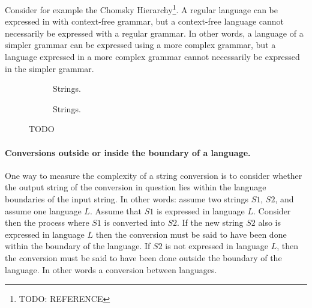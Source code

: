 \documentclass{scrreprt}
\begin{document}
Consider for example the Chomsky Hierarchy\footnote{TODO: REFERENCE}. A regular language can be expressed in with context-free grammar, but a context-free language cannot necessarily be expressed with a regular grammar. In other words, a language of a simpler grammar can be expressed using a more complex grammar, but a language expressed in a more complex grammar cannot necessarily be expressed in the simpler grammar.


\begin{figure}[h]
\centering

  \begin{subfigure}{.5\textwidth}
    \centering


    \caption{Strings.}
    \label{fig:concrete-specialization-tree-example-run}

  \end{subfigure}%
  \begin{subfigure}{.5\textwidth}

    \centering


    \caption{Strings.}
    \label{fig:concrete-specialization-tree-example-run}
  \end{subfigure}


  \caption{TODO}
  \label{fig:concrete-specialization-tree-example}
\end{figure}


\paragraph{Conversions outside or inside the boundary of a language.} One way to measure the complexity of a string conversion is to consider whether the output string of the conversion in question lies within the language boundaries of the input string. In other words: assume two strings $S1$, $S2$, and assume one language $L$. Assume that $S1$ is expressed in language $L$. Consider then the process where $S1$ is converted into $S2$. If the new string $S2$ also is expressed in language $L$ then the conversion must be said to have been done within the boundary of the language. If $S2$ is not expressed in language $L$, then the conversion must be said to have been done outside the boundary of the language. In other words a conversion between languages.
\end{document}
